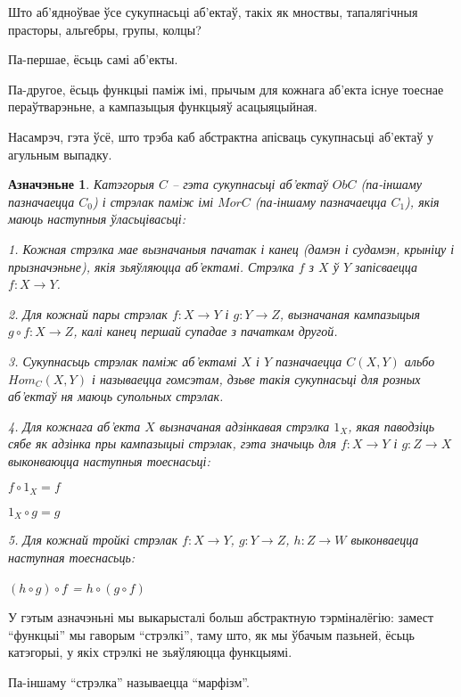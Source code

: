 \documentclass[a4paper,12pt]{book}
\newtheorem{definition}{Азначэньне}[section]
\begin{document}
Што аб'ядноўвае ўсе сукупнасьці аб'ектаў, такіх як мноствы,
тапалягічныя прасторы, альгебры, групы, колцы?

Па-першае, ёсьць самі аб'екты.

Па-другое, ёсьць функцыі паміж імі, прычым для кожнага аб'екта існуе
тоеснае пераўтварэньне, а кампазыцыя функцыяў асацыяцыйная.

Насамрэч, гэта ўсё, што трэба каб абстрактна апісваць сукупнасьці
аб'ектаў у агульным выпадку.

\begin{definition}
  Катэгорыя $C$ -- гэта сукупнасьці аб'ектаў ${Ob C}$ (па-іншаму
  пазначаецца $C_0$) і стрэлак паміж
  імі ${Mor C}$ (па-іншаму пазначаецца $C_1$), якія  маюць наступныя
  ўласьцівасьці:

  1. Кожная стрэлка мае вызначаныя пачатак і канец (дамэн і судамэн,
  крыніцу і прызначэньне),
  якія зьяўляюцца аб'ектамі. Стрэлка $f$ з $X$ ў $Y$ запісваецца
  ${f:X\rightarrow Y}$.

  2. Для кожнай пары стрэлак ${f:X\rightarrow Y}$ і ${g:Y\rightarrow
    Z}$, вызначаная кампазыцыя ${g \circ f:X\rightarrow Z}$, калі канец першай
  супадае з пачаткам другой.

  3. Сукупнасьць стрэлак паміж аб'ектамі $X$ і $Y$ пазначаецца
  $C(X,Y)$ альбо $Hom_C(X, Y)$ і называецца гомсэтам, дзьве такія
  сукупнасьці для розных аб'ектаў ня маюць
  супольных стрэлак.

  4. Для кожнага аб'екта $X$ вызначаная адзінкавая стрэлка $1_X$, якая
  паводзіць сябе як адзінка пры кампазыцыі стрэлак, гэта значыць для
  ${f:X \rightarrow Y}$ і ${g:Z\rightarrow X}$ выконваюцца наступныя
  тоеснасьці:

  $f \circ 1_X = f$

  $1_X \circ g = g$

  5. Для кожнай тройкі стрэлак ${f: X\rightarrow Y}$, ${g:Y\rightarrow
    Z}$, ${h:Z\rightarrow W}$ выконваецца наступная тоеснасьць:

  $(h \circ g) \circ f$ = $h \circ (g \circ f)$
\end{definition}

У гэтым азначэньні мы выкарысталі больш абстрактную тэрміналёгію:
замест ``функцыі'' мы гаворым ``стрэлкі'', таму што, як мы ўбачым
пазьней, ёсьць катэгорыі, у якіх стрэлкі не зьяўляюцца функцыямі.

Па-іншаму ``стрэлка'' называецца ``марфізм''.
\end{document}
